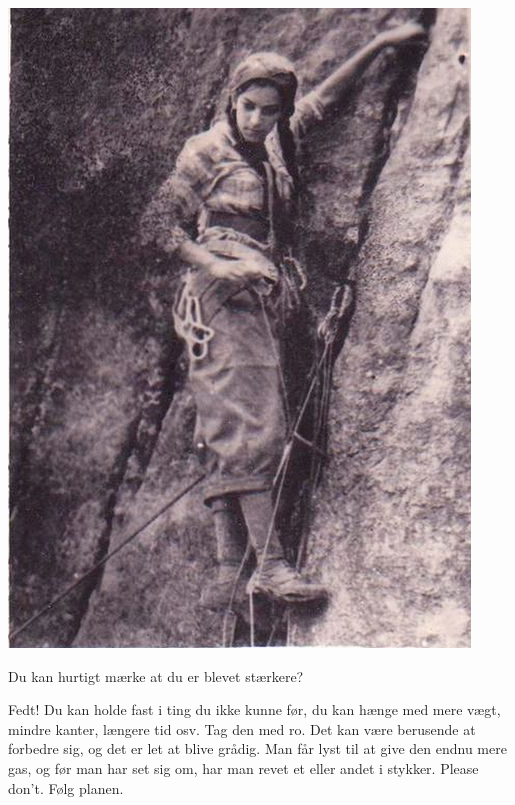 \begin{multicols}{2}
\begin{minipage}{\columnwidth}
\centering
\includegraphics{figs/oldSchoolCool}
\vspace{1em}
\end{minipage}



  \begin{tList}{Du kan hurtigt mærke at du er blevet stærkere?}
  \item   Fedt! Du kan holde
  fast i ting du ikke kunne før, du kan hænge med mere vægt, mindre
  kanter, længere tid osv. Tag den med ro. Det kan være berusende at
  forbedre sig, og det er let at blive grådig. Man får lyst til at
  give den endnu mere gas, og før man har set sig om, har man revet
  et eller andet i stykker. Please don't. Følg planen.
  \end{tList}
\end{multicols}
